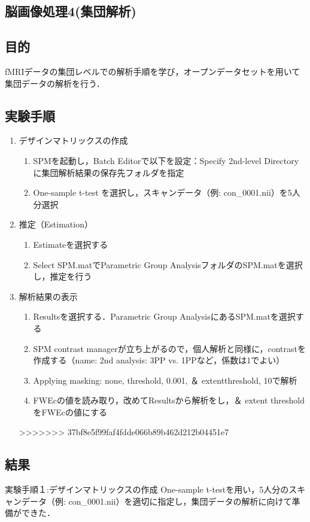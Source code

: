 \documentclass{jlreq}
\begin{document}
\begin{enumerate}
\begin{enumerate}
\begin{enumerate}
\section{脳画像処理4(集団解析)}
\subsection{目的}
fMRIデータの集団レベルでの解析手順を学び，オープンデータセットを用いて集団データの解析を行う．

\subsection{実験手順}
\begin{enumerate}
    \item デザインマトリックスの作成
        \begin{enumerate}
            \item SPMを起動し，Batch Editorで以下を設定：Specify 2nd-level Directory に集団解析結果の保存先フォルダを指定
            \item One-sample t-test を選択し，スキャンデータ（例: con\_0001.nii）を5人分選択
        \end{enumerate}
    \item 推定（Estimation）
        \begin{enumerate}
            \item Estimateを選択する
            \item Select SPM.matでParametric Group AnalysisフォルダのSPM.matを選択し，推定を行う
        \end{enumerate}
    \item 解析結果の表示
        \begin{enumerate}
            \item Resultsを選択する．Parametric Group AnalysisにあるSPM.matを選択する
            \item SPM contrast managerが立ち上がるので，個人解析と同様に，contrastを作成する（name: 2nd
                analysis: 3PP vs. 1PPなど，係数は1でよい）
            \item Applying masking: none, threshold, 0.001, ＆ extentthreshold, 10で解析
            \item FWEcの値を読み取り，改めてResultsから解析をし，＆ extent thresholdをFWEcの値にする
        \end{enumerate}
>>>>>>> 37bf8e5f99faf4fdde066b89b462d212b04451e7
\end{enumerate}
\subsection{結果}
実験手順１:デザインマトリックスの作成
One-sample t-testを用い，5人分のスキャンデータ（例: con\_0001.nii）を適切に指定し，集団データの解析に向けて準備ができた．


\end{enumerate}
\end{enumerate}
\end{enumerate}
\end{document}
